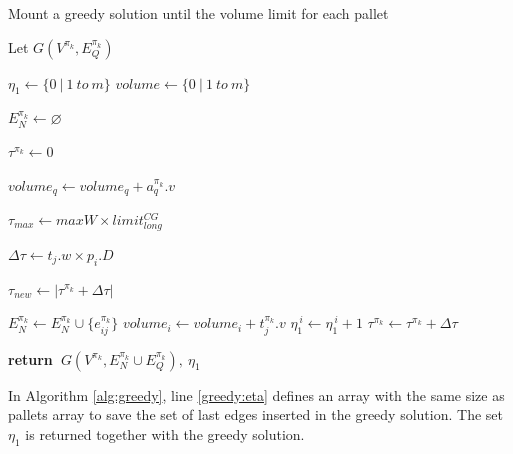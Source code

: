 \documentclass[preprint,authoryear]{elsarticle}
\renewcommand{\Return}{\State \bf {return}~}
\begin{document}
\begin{algorithm}[H]
	\caption{Mount a greedy solution until the volume limit for each pallet}  \label{alg:greedy}
	
	\begin{algorithmic}[1]
		
		
		\State Let $G(V^{\pi_k}, E_Q^{\pi_k})$
		
		\State $\eta_1 \gets \{0\ |\ 1\ to\ m \}$ \label{greedy:eta}
		\State $volume \gets \{0\ |\ 1\ to\ m \}$
		
	
		\State $E_N^{\pi_k} \gets \varnothing$ 
		
		\State $\tau^{\pi_k} \gets 0$	 	
		
		\State $volume_q \gets volume_q + a_q^{\pi_k}.v$ 
		\EndIf		
		\EndFor
		
		\State $\tau_{max} \gets maxW \times limit^{CG}_{long}$ 
		
		
		\State $\Delta\tau \gets t_j.w \times p_i.D$
		
		\State $\tau_{new} \gets | \tau^{\pi_k} + \Delta\tau |$
		
		 \label{greedy:ts}
				 
			\State $E_N^{\pi_k} \gets E_N^{\pi_k} \cup \{e_{ij}^{\pi_k}\}$ 
			\State $volume_i \gets volume_i + t_j^{\pi_k}.v$
			\State $\eta_1^{\ i} \gets \eta_1^{\ i} + 1$ 
			\State $\tau^{\pi_k} \gets \tau^{\pi_k} + \Delta\tau$
			
		\EndIf
		\EndFor {}
		
		\Return $G(V^{\pi_k}, E_N^{\pi_k} \cup E_Q^{\pi_k}),\ \eta_1$
		
		\EndProcedure
		
	\end{algorithmic}
\end{algorithm}

In Algorithm \ref{alg:greedy}, line \ref{greedy:eta} defines an array with the same size as pallets array to save the set of last edges inserted in the greedy solution. The set $\eta_1$ is returned together with the greedy solution.
\end{document}
